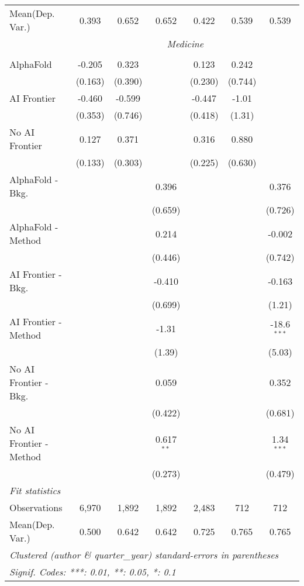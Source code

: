 \begin{tabular}{lcccccc}
Mean(Dep. Var.) & 0.393 & 0.652 & 0.652 & 0.422 & 0.539 & 0.539 \\
 & \multicolumn{6}{c}{\textit{Medicine}} \\ \\
   AlphaFold               & -0.205  & 0.323   &              & 0.123   & 0.242   &   \\   
                           & (0.163) & (0.390) &              & (0.230) & (0.744) &   \\   
   AI Frontier             & -0.460  & -0.599  &              & -0.447  & -1.01   &   \\   
                           & (0.353) & (0.746) &              & (0.418) & (1.31)  &   \\   
   No AI Frontier          & 0.127   & 0.371   &              & 0.316   & 0.880   &   \\   
                           & (0.133) & (0.303) &              & (0.225) & (0.630) &   \\   
   AlphaFold - Bkg.        &         &         & 0.396        &         &         & 0.376\\   
                           &         &         & (0.659)      &         &         & (0.726)\\   
   AlphaFold - Method      &         &         & 0.214        &         &         & -0.002\\   
                           &         &         & (0.446)      &         &         & (0.742)\\   
   AI Frontier - Bkg.      &         &         & -0.410       &         &         & -0.163\\   
                           &         &         & (0.699)      &         &         & (1.21)\\   
   AI Frontier - Method    &         &         & -1.31        &         &         & -18.6$^{***}$\\   
                           &         &         & (1.39)       &         &         & (5.03)\\   
   No AI Frontier - Bkg.   &         &         & 0.059        &         &         & 0.352\\   
                           &         &         & (0.422)      &         &         & (0.681)\\   
   No AI Frontier - Method &         &         & 0.617$^{**}$ &         &         & 1.34$^{***}$\\   
                           &         &         & (0.273)      &         &         & (0.479)\\   
   \midrule
   \emph{Fit statistics}\\
   Observations            & 6,970   & 1,892   & 1,892        & 2,483   & 712     & 712\\  
Mean(Dep. Var.) & 0.500 & 0.642 & 0.642 & 0.725 & 0.765 & 0.765 \\
   \midrule \midrule
   \multicolumn{7}{l}{\emph{Clustered (author \& quarter\_year) standard-errors in parentheses}}\\
   \multicolumn{7}{l}{\emph{Signif. Codes: ***: 0.01, **: 0.05, *: 0.1}}\\
\end{tabular}
\par\endgroup
